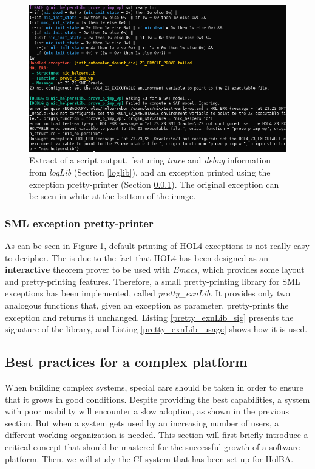 \documentclass[10pt,a4paper]{article}
\begin{document}
\begin{multicols}{2}
\begin{figure}[t]
	\includegraphics[width=\textwidth]{figures/loglib-ppexn-ppterm.png}
	\centering
	\caption{Extract of a script output, featuring \textit{trace} and \textit{debug} information from \textit{logLib} (Section \ref{loglib}), and an exception printed using the exception pretty-printer (Section \ref{pp_exn}). The original exception can be seen in white at the bottom of the image.}
	\label{loglib-ppexn-ppterm}
\end{figure}

\subsubsection{SML exception pretty-printer} \label{pp_exn}

As can be seen in Figure \ref{loglib-ppexn-ppterm}, default printing of HOL4 exceptions is not really easy to decipher. The is due to the fact that HOL4 has been designed as an \textbf{interactive} theorem prover to be used with \textit{Emacs}, which provides some layout and pretty-printing features. Therefore, a small pretty-printing library for SML exceptions has been implemented, called \textit{pretty\_exnLib}. It provides only two analogous functions that, given an exception as parameter, pretty-prints the exception and returns it unchanged. Listing \ref{pretty_exnLib_sig} presents the signature of the library, and Listing \ref{pretty_exnLib_usage} shows how it is used.


\subsection{Best practices for a complex platform} \label{best-practices-complex-platform}

When building complex systems, special care should be taken in order to ensure that it grows in good conditions. Despite providing the best capabilities, a system with poor usability will encounter a slow adoption, as shown in the previous section. But when a system gets used by an increasing number of users, a different working organization is needed. This section will first briefly introduce a critical concept that should be mastered for the successful growth of a software platform. Then, we will study the {CI} system that has been set up for HolBA.


\end{multicols}
\end{document}
